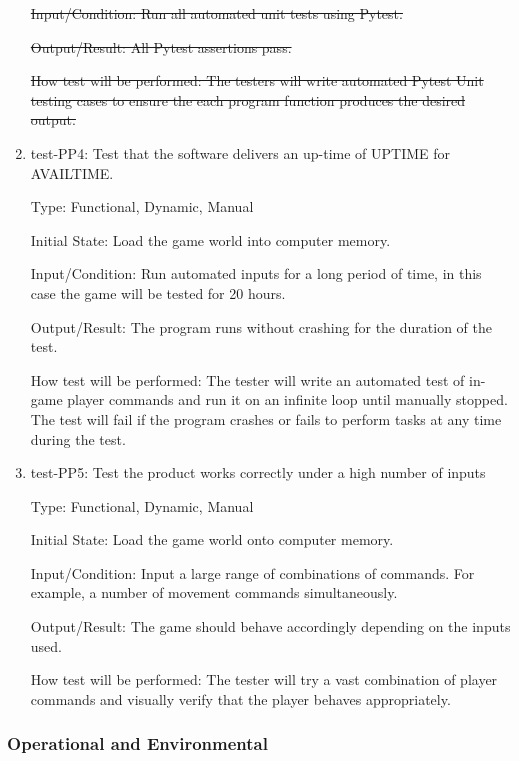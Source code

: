 \documentclass[12pt, titlepage]{article}
\begin{document}
\begin{enumerate}
\sout{Input/Condition: Run all automated unit tests using Pytest.}
					
\sout{Output/Result: All Pytest assertions pass.}
					
\sout{How test will be performed: The testers will write automated Pytest Unit testing cases to ensure the each program function produces the desired output.}

\item{test-PP4: Test that the software delivers an up-time of UPTIME for AVAILTIME. \\}

Type: Functional, Dynamic, Manual
					
Initial State: Load the game world into computer memory.
					
Input/Condition: Run automated inputs for a long period of time, in this case the game will be tested for 20 hours.

Output/Result: The program runs without crashing for the duration of the test.
					
How test will be performed: The tester will write an automated test of in-game player commands and run it on an infinite loop until manually stopped. The test will fail if the program crashes or fails to perform tasks at any time during the test.

\item{test-PP5: Test the product works correctly under a high number of inputs\\}

Type: Functional, Dynamic, Manual
					
Initial State: Load the game world onto computer memory.
					
Input/Condition: Input a large range of combinations of commands. For example, a number of movement commands simultaneously.
					
Output/Result: The game should behave accordingly depending on the inputs used.
					
How test will be performed: The tester will try a vast combination of player commands and visually verify that the player behaves appropriately.

\end{enumerate}


\subsubsection{Operational and Environmental}
\end{document}
